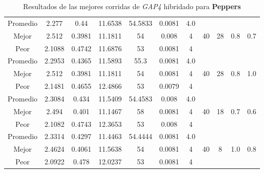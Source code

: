 \begin{table}[h!]
\begin{center}
\begin{tabular}{|c|c|c|c|c|c|c|c|c|c|c|}
        \hline
        \hline
            Promedio  & 2.277 & 0.44 & 11.6538 & 54.5833 & 0.0081 & 4.0 &  &  &  & \\
            \cline{1-7}
            Mejor & 2.512 & 0.3981  & 11.1811 & 54 & 0.008 & 4 & 40 & 28 & 0.8 & 0.7\\
            \cline{1-7}
            Peor & 2.1088 & 0.4742  & 11.6876 & 53 & 0.0081 & 4 &  &  &  & \\
        \hline
        \hline
            Promedio  & 2.2953 & 0.4365 & 11.5893 & 55.3 & 0.0081 & 4.0 &  &  &  & \\
            \cline{1-7}
            Mejor & 2.512 & 0.3981  & 11.1811 & 54 & 0.0081 & 4 & 40 & 28 & 0.8 & 1.0\\
            \cline{1-7}
            Peor & 2.1481 & 0.4655  & 12.4866 & 53 & 0.0079 & 4 &  &  &  & \\
        \hline
        \hline
            Promedio  & 2.3084 & 0.434 & 11.5409 & 54.4583 & 0.008 & 4.0 &  &  &  & \\
            \cline{1-7}
            Mejor & 2.494 & 0.401  & 11.1467 & 58 & 0.0081 & 4 & 40 & 18 & 0.7 & 0.6\\
            \cline{1-7}
            Peor & 2.1082 & 0.4743  & 12.3653 & 53 & 0.008 & 4 &  &  &  & \\
        \hline
        \hline
            Promedio  & 2.3314 & 0.4297 & 11.4463 & 54.4444 & 0.0081 & 4.0 &  &  &  & \\
            \cline{1-7}
            Mejor & 2.4624 & 0.4061  & 11.5638 & 54 & 0.0081 & 4 & 40 & 8 & 1.0 & 0.8\\
            \cline{1-7}
            Peor & 2.0922 & 0.478  & 12.0237 & 53 & 0.0081 & 4 &  &  &  & \\
        \hline
        \end{tabular}
        \caption{Resultados de las mejores corridas de \emph{GAP4} hibridado para {\bf Peppers}}
        \label{tb:tableGAP4}
    \end{center}
\end{table}
